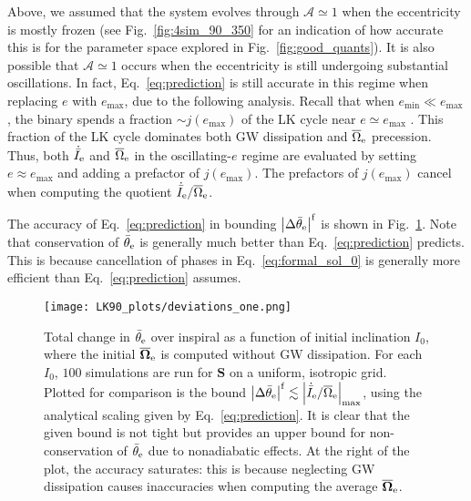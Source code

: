 \documentclass[
        twocolumn,
        twocolappendix
    ]{aastex63}
\newcommand*{\abs}[1]{\left|#1\right|}
\renewcommand*{\bm}[1]{\boldsymbol{\mathbf{#1}}}
\begin{document}
Above, we assumed that the system evolves through $\mathcal{A} \simeq 1$  when
the eccentricity is mostly frozen (see Fig.~\ref{fig:4sim_90_350} for an
indication of how accurate this is for the parameter space explored in
Fig.~\ref{fig:good_quants}). It is also possible that $\mathcal{A} \simeq 1$
occurs when the eccentricity is still undergoing substantial oscillations. In
fact, Eq.~\eqref{eq:prediction} is still accurate in this regime when replacing
$e$ with $e_{\max}$, due to the following analysis. Recall that when $e_{\min}
\ll e_{\max}$, the binary spends a fraction $\sim j(e_{\max})$ of the LK cycle
near $e \simeq e_{\max}$ \citep{anderson2016formation}. This fraction of the LK
cycle dominates both GW dissipation and $\overline{\Omega}_{\rm e}$ precession.
Thus, both $\dot{\bar{I}}_{\rm e}$ and $\overline{\Omega}_{\rm e}$ in the
oscillating-$e$ regime are evaluated by setting $e \approx e_{\max}$ and adding
a prefactor of $j(e_{\max})$. The prefactors of $j(e_{\max})$ cancel when
computing the quotient $\dot{\bar{I}}_{\rm e} / \overline{\Omega}_{\rm e}$.

The accuracy of Eq.~\eqref{eq:prediction} in bounding $\abs{\Delta
\bar{\theta}_{\rm e}}^{\rm f}$ is shown in Fig.~\ref{fig:deviations}. Note that
conservation of $\bar{\theta}_{\rm e}$ is generally much better than
Eq.~\eqref{eq:prediction} predicts. This is because cancellation of phases in
Eq.~\eqref{eq:formal_sol_0} is generally more efficient than
Eq.~\eqref{eq:prediction} assumes.
\begin{figure}
    \centering
    \texttt{[image: LK90\_plots/deviations\_one.png]}
    \caption{Total change in $\bar{\theta}_{\rm e}$ over inspiral as a function of
    initial inclination $I_0$, where the initial $\bm{\overline{\Omega}}_{\rm
    e}$ is computed without GW dissipation. For each $I_0$, $100$ simulations
    are run for $\bm{S}$ on a uniform, isotropic grid. Plotted for comparison is
    the bound $\abs{\Delta \bar{\theta}_{\rm e}}^{\rm f} \lesssim
    \abs{\dot{\bar{I}}_{\rm e} /
    \overline{\Omega}_{\rm e}}_{\max}$, using the analytical scaling given by
    Eq.~\eqref{eq:prediction}. It is clear that the given bound is not tight but
    provides an upper bound for non-conservation of $\bar{\theta}_{\rm e}$ due to
    nonadiabatic effects. At the right of the plot, the accuracy saturates: this
    is because neglecting GW dissipation causes inaccuracies when computing the
    average $\bm{\overline{\Omega}}_{\rm e}$.}\label{fig:deviations}
\end{figure}
\end{document}

